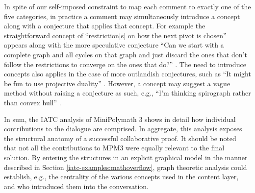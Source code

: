 \documentclass[smallextended,oneside]{svjour3}       %
\let\cite\citep
\newcommand\nothing[1]{#1}
\let\paragraph\nothing
\begin{document}
{\paragraph{In spite of our self-imposed constraint to map each comment to exactly one of the five categories, in practice a comment may simultaneously introduce a concept along with a conjecture that applies that concept.}
For example the straightforward concept of
``restriction[s] on how the next pivot is chosen''
appears along with the more speculative conjecture  ``Can we
start with a complete graph and all cycles on that graph and just
discard the ones that don't follow the restrictions to converge on the
ones that do?''
\cite[\href{https://wp.me/pAG2F-41\#comment-3368}{July 19, 8:56 pm}]{tao2011imo}.
The need to introduce concepts also applies in the case of more outlandish conjectures,
such as
``It might be fun to use projective duality''
\cite[\href{https://wp.me/pAG2F-41\#comment-3324}{July 19, 8:23 pm}]{tao2011imo}.
However, a concept may suggest a vague method
without raising a conjecture as such,
e.g., ``I'm thinking spirograph rather than convex hull''
\cite[\href{https://wp.me/pAG2F-41\#comment-3349}{July 19, 8:44 pm}]{tao2011imo}.

\paragraph{In sum, the IATC analysis of MiniPolymath 3 shows in detail how individual contributions to the dialogue are comprised.}
In aggregate, this analysis exposes the structural anatomy of a successful collaborative proof.
It should be noted that not all the contributions to MPM3 were equally relevant to the final solution.   By entering the structures in an explicit graphical model in the manner described in Section \ref{iatc-examples:mathoverflow}, graph theoretic analysis could establish, e.g., the centrality of the various concepts used in the content layer, and who introduced them into the conversation.  

\FloatBarrier

}
\end{document}
